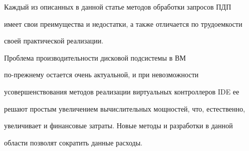      


     Каждый из описанных в данной статье методов обработки запросов ПДП 


имеет свои преимущества и недостатки, а также отличается по трудоемкости 


своей практической реализации.


     


     Проблема производительности дисковой подсистемы в ВМ 


     по-преж\-не\-му остается очень актуальной, и при невозможности 


усовершенствования методов реализации виртуальных контроллеров IDE ее 


решают простым увеличением вычислительных мощностей, что, естественно, 


увеличивает и финансовые затраты. Новые методы и разработки в данной 


области позволят сократить данные расходы.





